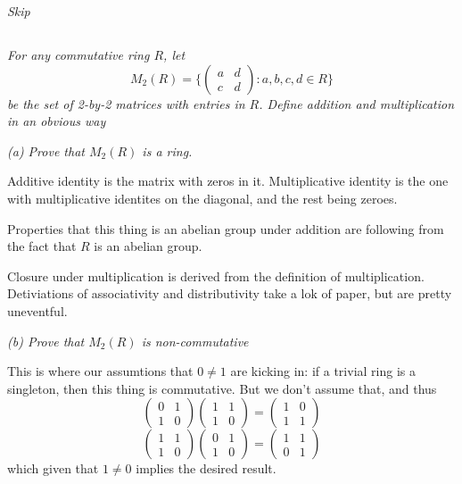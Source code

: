 \documentclass[11pt,oneside,titlepage]{book}
\newcommand{\set}[1]{\{ #1 \}}
\begin{document}
\textit{Skip}

\subsection{}

\textit{For any commutative ring $R$, let
  $$M_2(R) = \set{
    \begin{pmatrix} a & d \\ c & d
    \end{pmatrix}: a, b, c, d \in R }$$ be the set of 2-by-2 matrices
with entries in $R$. Define addition and multiplication in an obvious
way }

\textit{(a) Prove that $M_2(R)$ is a ring.}

Additive identity is the matrix with zeros in it. Multiplicative
identity is the one with multiplicative identites on the diagonal, and
the rest being zeroes.

Properties that this thing is an abelian group under addition are
following from the fact that $R$ is an abelian group.

Closure under multiplication is derived from the definition of
multiplication.  Detiviations of associativity and distributivity take
a lok of paper, but are pretty uneventful.

\textit{(b) Prove that $M_2(R)$ is non-commutative}

This is where our assumtions that $0 \neq 1$ are kicking in: if a
trivial ring is a singleton, then this thing is commutative.  But we
don't assume that, and thus
$$
\begin{pmatrix} 0 & 1 \\ 1 & 0
\end{pmatrix}
\begin{pmatrix} 1 & 1 \\ 1 & 0
\end{pmatrix} =
\begin{pmatrix} 1 & 0 \\ 1 & 1
\end{pmatrix}
$$
$$
\begin{pmatrix} 1 & 1 \\ 1 & 0
\end{pmatrix}
\begin{pmatrix} 0 & 1 \\ 1 & 0
\end{pmatrix} =
\begin{pmatrix} 1 & 1 \\ 0 & 1
\end{pmatrix}
$$
which given that $1 \neq 0$ implies the desired result.
\end{document}
